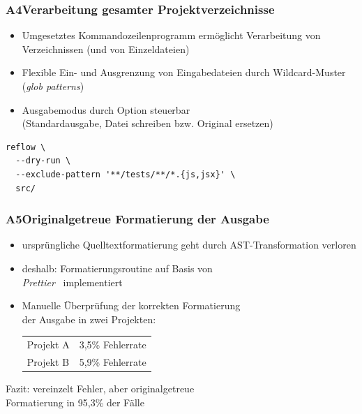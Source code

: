       \begin{frame}[fragile]
        \frametitle{A4\hspace{0.75em}Verarbeitung gesamter Projektverzeichnisse}
        \begin{itemize}
          \item Umgesetztes Kommandozeilenprogramm ermöglicht Verarbeitung von Verzeichnissen (und von Einzeldateien)
          \item Flexible Ein- und Ausgrenzung von Eingabedateien durch Wildcard-Muster (\textit{glob patterns})
          \item Ausgabemodus durch Option steuerbar\\(Standardausgabe, Datei schreiben bzw. Original ersetzen)
        \end{itemize}

        \bigskip
        \begin{lstlisting}[numbers=none]
reflow \
  --dry-run \
  --exclude-pattern '**/tests/**/*.{js,jsx}' \
  src/
        \end{lstlisting}
      \end{frame}

      \begin{frame}
        \frametitle{A5\hspace{0.75em}Originalgetreue Formatierung der Ausgabe}
        \begin{itemize}
          \item ursprüngliche Quelltextformatierung geht durch AST-Transformation verloren
          \item deshalb: Formatierungsroutine auf Basis von\\\textit{Prettier}~\autocite{SOFTWARE:PRETTIER} implementiert
          \item Manuelle Überprüfung der korrekten Formatierung\\der Ausgabe in zwei Projekten:\\
            \medskip
            {
              \footnotesize
              \begin{tabu} to 
                Projekt A & 3,5\% Fehlerrate \\
                Projekt B & 5,9\% Fehlerrate \\
              \end{tabu}
            }
        \end{itemize}
        \vspace{1em}
        Fazit: vereinzelt Fehler, aber originalgetreue\\Formatierung in 95,3\% der Fälle
      \end{frame}

